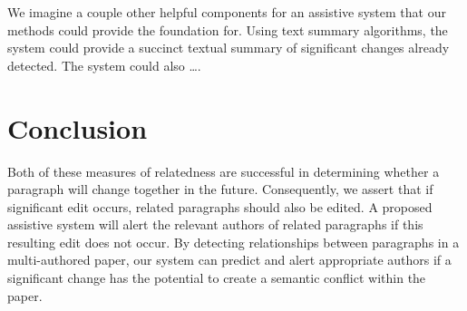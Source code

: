 We imagine a couple other helpful components for an assistive system
that our methods could provide the foundation for. Using text summary
algorithms, the system could provide a succinct textual summary of
significant changes already detected. The system could also \ldots{}.

\section{Conclusion}\label{conclusion}

Both of these measures of relatedness are successful in determining
whether a paragraph will change together in the future. Consequently, we
assert that if significant edit occurs, related paragraphs should also
be edited. A proposed assistive system will alert the relevant authors
of related paragraphs if this resulting edit does not occur. By
detecting relationships between paragraphs in a multi-authored paper,
our system can predict and alert appropriate authors if a significant
change has the potential to create a semantic conflict within the paper.
